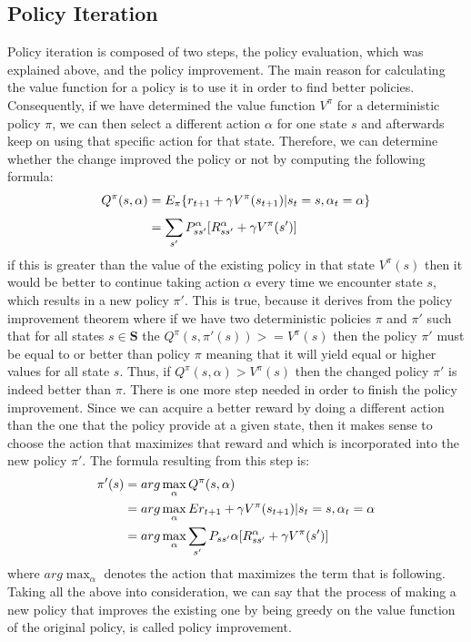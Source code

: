 \documentclass[paper=a4, fontsize=11pt]{scrartcl}
\numberwithin{equation}{section}		%
\numberwithin{figure}{section}			%
\numberwithin{table}{section}				%
\begin{document}
\subsection{Policy Iteration}
\label{PIter}
Policy iteration is composed of two steps, the policy evaluation, which was explained above, and the policy improvement. The main reason for calculating the value function for a policy is to use it in order to find better policies. Consequently, if we have determined the value function $V^{\pi}$ for a deterministic policy $\pi$, we can then select a different action $\alpha$ for one state $s$ and afterwards keep on using that specific action for that state. Therefore, we can determine whether the change improved the policy or not by computing the following formula:
\begin{align}
Q^\pi(s,\alpha) & = E_\pi \{r_{t+1} + \gamma V^{\pi} (s_{t+1})| s_t = s, \alpha_t = \alpha\}\notag\\
& = \sum_{s'}^{}P_{ss'}^{\alpha}[R_{ss'}^{\alpha}+\gamma V^\pi(s')]
\end{align}
if this is greater than the value of the existing policy in that state $V^\pi(s)$ then it would be better to continue taking action $\alpha$ every time we encounter state $s$, which results in a new policy $\pi'$. This is true, because it derives from the policy improvement theorem where if we have two deterministic policies $\pi$ and $\pi'$ such that for all states $s \in \mathbf{S}$ the $Q^\pi(s,\pi'(s)) >= V^\pi(s)$ then the policy $\pi'$ must be equal to or better than policy $\pi$ meaning that it will yield equal or higher values for all state $s$. Thus, if $Q^\pi(s,\alpha) > V^\pi(s)$ then the changed policy $\pi'$ is indeed better than $\pi$. There is one more step needed in order to finish the policy improvement. Since we can acquire a better reward by doing a different action than the one that the policy provide at a given state, then it makes sense to choose the action that maximizes that reward and which is incorporated into the new policy $\pi'$. The formula resulting from this step is:
\begin{align}
\pi'(s) &= arg\max_\alpha Q^\pi(s,\alpha)\notag\\
&= arg\max_\alpha E{r_{t+1} + \gamma V^\pi(s_{t+1})|s_t=s,\alpha_t=\alpha}\notag\\
&= arg\max_\alpha \sum_{s'}P_{ss'}{\alpha}[R_{ss'}^{\alpha} + \gamma V^\pi(s')]
\end{align}
where $arg\max_\alpha$ denotes the action that maximizes the term that is following. Taking all the above into consideration, we can say that the process of making a new policy that improves the existing one by being greedy on the value function of the original policy, is called policy improvement.
\end{document}
